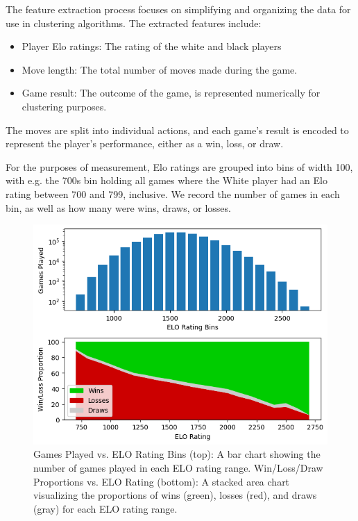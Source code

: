 \documentclass[conference]{IEEEtran}
\begin{document}
The feature extraction process focuses on simplifying and organizing the data for use in clustering algorithms. The extracted features include:
\begin{itemize}
    \item Player Elo ratings: The rating of the white and black players
    \item Move length: The total number of moves made during the game.
    \item Game result: The outcome of the game, is represented numerically for clustering purposes.
\end{itemize}
The moves are split into individual actions, and each game's result is encoded to represent the player's performance, either as a win, loss, or draw.

For the purposes of measurement, Elo ratings are grouped into bins of width 100, with e.g. the 700s bin holding all games where the White player had an Elo rating between 700 and 799, inclusive. We record the number of games in each bin, as well as how many were wins, draws, or losses.

\begin{figure}[htbp]
\centerline{\includegraphics[scale=0.5]{Distribution and Win-Loss Proportion by ELO.png}}
\caption{Games Played vs. ELO Rating Bins (top): A bar chart showing the number of games played in each ELO rating range.
Win/Loss/Draw Proportions vs. ELO Rating (bottom): A stacked area chart visualizing the proportions of wins (green), losses (red), and draws (gray) for each ELO rating range.}
\label{fig}
\end{figure}
\end{document}
